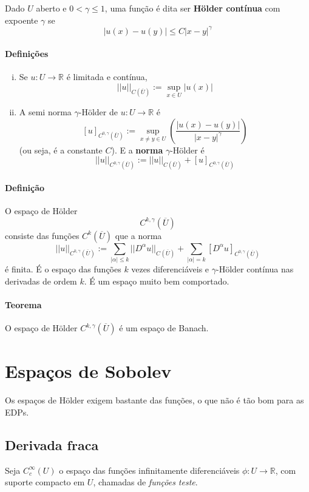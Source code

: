 \documentclass[11pt]{article}
\newcommand{\R}{\mathbb{R}}
\newcommand{\holder}[2][k,\gamma]{{C^{#1}(\overline{#2})}}
\begin{document}
Dado \( U \) aberto e \( 0 < \gamma \leq 1 \), uma função é dita ser \textbf{Hölder contínua} com expoente \( \gamma \) se \[ |u(x)-u(y)| \leq C |x-y|^\gamma \]

\paragraph{Definições} \begin{enumerate}[(i)]
	\item Se \( u:U \rightarrow \R \) é limitada e contínua, \[ ||u||_{C(\overline{U})} := \sup_{x \in U} |u(x)| \]
	\item A semi norma \( \gamma \)-Hölder de \( u:U \rightarrow \R \) é \[ [u]_{C^{0,\gamma}(\overline{U})} := \sup_{x\neq y \in U} \left( \frac{|u(x) - u(y)|}{|x-y|^\gamma}\right) \] (ou seja, é a constante \( C \)). E a \textbf{norma} \( \gamma\)-Hölder é \[ ||u||_{C^{0,\gamma}(\overline{U})} := ||u||_{C(\overline{U})} + [u]_{C^{0,\gamma}(\overline{U})} \]
\end{enumerate}

\paragraph{Definição} O espaço de Hölder \[ \holder{U}  \] consiste das funções \( \holder[k]{U} \) que a norma \[ ||u||_{\holder{U}} := \sum_{|\alpha|\leq k} || D^\alpha u ||_{\holder[]{U}} + \sum_{|\alpha|=k} [ D^\alpha u ]_{\holder[0,\gamma]{U}} \] é finita. É o espaço das funções \( k\) vezes diferenciáveis e \( \gamma \)-Hölder contínua nas derivadas de ordem \( k \). É um espaço muito bem comportado.

\paragraph{Teorema} O espaço de Hölder \( \holder{U} \) é um espaço de Banach.


\section{Espaços de Sobolev}

Os espaços de Hölder exigem bastante das funções, o que não é tão bom para as EDPs.

\subsection*{Derivada fraca}

Seja \( C^{\infty}_c (U) \) o espaço das funções infinitamente diferenciáveis \( \phi:U\rightarrow \R \), com suporte compacto em \( U \), chamadas de \textit{funções teste}. 
\end{document}
